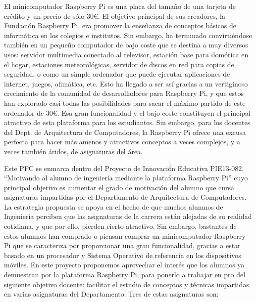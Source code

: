 
\minitoc

\begin{sinopsis}
\label{sec:intro:sinop}
El minicomputador Raspberry Pi es una placa del tamaño de una tarjeta de crédito y un
precio de sólo 30€. El objetivo principal de sus creadores, la Fundación Raspberry Pi,
era promover la enseñanza de conceptos básicos de informática en los colegios e institutos.
Sin embargo, ha terminado convirtiéndose también en un pequeño computador de bajo
coste que se destina a muy diversos usos: servidor multimedia conectado al televisor,
estación base para domótica en el hogar, estaciones meteorológicas, servidor de discos
en red para copias de seguridad, o como un simple ordenador que puede ejecutar
aplicaciones de internet, juegos, ofimática, etc. Esto ha llegado a ser así gracias
a un vertiginoso crecimiento de la comunidad de desarrolladores para Raspberry Pi,
y que estos han explorado casi todas las posibilidades para sacar el máximo partido
de este ordenador de 30€. Esa gran funcionalidad y el bajo coste constituyen el
principal atractivo de esta plataforma para los estudiantes. Sin embargo, para los
docentes del Dept. de Arquitectura de Computadores, la Raspberry Pi ofrece una excusa
perfecta para hacer más amenos y atractivos conceptos a veces complejos, y a veces
también áridos, de asignaturas del área.

Este PFC se enmarca dentro del Proyecto de Innovación Educativa PIE13-082, ``Motivando
al alumno de ingeniería mediante la plataforma Raspberry Pi'' cuyo principal objetivo es
aumentar el grado de motivación del alumno que cursa asignaturas impartidas por el
Departamento de Arquitectura de Computadores. La estrategia propuesta se apoya en el
hecho de que muchos alumnos de Ingeniería perciben que las asignaturas de la carrera
están alejadas de su realidad cotidiana, y que por ello, pierden cierto atractivo. Sin
embargo, bastantes de estos alumnos han comprado o piensan comprar un minicomputador
Raspberry Pi que se caracteriza por proporcionar una gran funcionalidad, gracias a
estar basado en un procesador y Sistema Operativo de referencia en los dispositivos
móviles. En este proyecto proponemos aprovechar el interés que los alumnos ya
demuestran por la plataforma Raspberry Pi, para ponerlo a trabajar en pro del
siguiente objetivo docente: facilitar el estudio de conceptos y técnicas impartidas
 en varias asignaturas del Departamento. Tres de estas asignaturas son:


\end{sinopsis}
